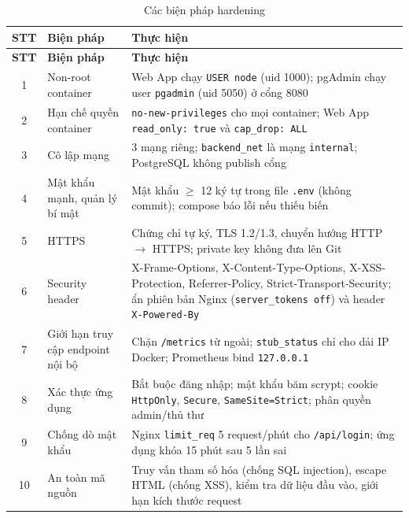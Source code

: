 \documentclass[../main.tex]{subfiles}
\begin{document}
\begin{longtable}{|c|p{4.2cm}|p{9.4cm}|}
\caption{Các biện pháp hardening}
\label{tab:hardening}\\
\hline
\textbf{STT} & \textbf{Biện pháp} & \textbf{Thực hiện} \\
\hline
\endfirsthead
\hline
\textbf{STT} & \textbf{Biện pháp} & \textbf{Thực hiện} \\
\hline
\endhead
1 & Non-root container & Web App chạy \texttt{USER node} (uid 1000); pgAdmin chạy user \texttt{pgadmin} (uid 5050) ở cổng 8080 \\ \hline
2 & Hạn chế quyền container & \texttt{no-new-privileges} cho mọi container; Web App \texttt{read\_only: true} và \texttt{cap\_drop: ALL} \\ \hline
3 & Cô lập mạng & 3 mạng riêng; \texttt{backend\_net} là mạng \texttt{internal}; PostgreSQL không publish cổng \\ \hline
4 & Mật khẩu mạnh, quản lý bí mật & Mật khẩu $\geq$ 12 ký tự trong file \texttt{.env} (không commit); compose báo lỗi nếu thiếu biến \\ \hline
5 & HTTPS & Chứng chỉ tự ký, TLS 1.2/1.3, chuyển hướng HTTP $\rightarrow$ HTTPS; private key không đưa lên Git \\ \hline
6 & Security header & X-Frame-Options, X-Content-Type-Options, X-XSS-Protection, Referrer-Policy, Strict-Transport-Security; ẩn phiên bản Nginx (\texttt{server\_tokens off}) và header \texttt{X-Powered-By} \\ \hline
7 & Giới hạn truy cập endpoint nội bộ & Chặn \texttt{/metrics} từ ngoài; \texttt{stub\_status} chỉ cho dải IP Docker; Prometheus bind \texttt{127.0.0.1} \\ \hline
8 & Xác thực ứng dụng & Bắt buộc đăng nhập; mật khẩu băm scrypt; cookie \texttt{HttpOnly}, \texttt{Secure}, \texttt{SameSite=Strict}; phân quyền admin/thủ thư \\ \hline
9 & Chống dò mật khẩu & Nginx \texttt{limit\_req} 5 request/phút cho \texttt{/api/login}; ứng dụng khóa 15 phút sau 5 lần sai \\ \hline
10 & An toàn mã nguồn & Truy vấn tham số hóa (chống SQL injection), escape HTML (chống XSS), kiểm tra dữ liệu đầu vào, giới hạn kích thước request \\ \hline
\end{longtable}
\end{document}
